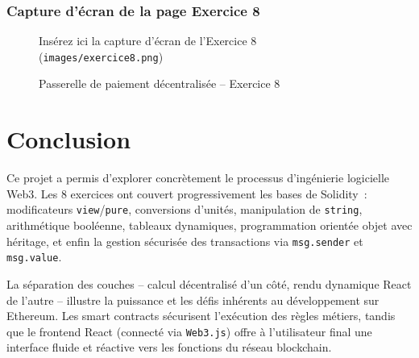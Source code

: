 \documentclass[12pt,a4paper]{report}
\begin{document}
\subsection{Capture d'écran de la page Exercice 8}
\begin{figure}[h!]
    \centering
    \begin{tcolorbox}[colback=red!5,colframe=red!50!black,title=Capture d'écran manquante]
        Insérez ici la capture d'écran de l'Exercice 8 (\texttt{images/exercice8.png})
    \end{tcolorbox}
    \caption{Passerelle de paiement décentralisée -- Exercice 8}
\end{figure}

\newpage

\chapter{Conclusion}
Ce projet a permis d'explorer concrètement le processus d'ingénierie logicielle Web3.
Les 8 exercices ont couvert progressivement les bases de Solidity~: modificateurs \texttt{view}/\texttt{pure},
conversions d'unités, manipulation de \texttt{string}, arithmétique booléenne, tableaux dynamiques,
programmation orientée objet avec héritage, et enfin la gestion sécurisée des transactions via
\texttt{msg.sender} et \texttt{msg.value}.

La séparation des couches -- calcul décentralisé d'un côté, rendu dynamique React de l'autre --
illustre la puissance et les défis inhérents au développement sur Ethereum. Les smart contracts
sécurisent l'exécution des règles métiers, tandis que le frontend React (connecté via \texttt{Web3.js})
offre à l'utilisateur final une interface fluide et réactive vers les fonctions du réseau blockchain.
\end{document}
